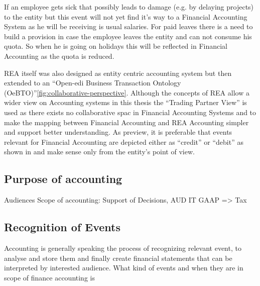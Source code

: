 If an employee gets sick that possibly leads to damage (e.g. by delaying projects) to the entity but this event will not yet find it's way to a Financial Accounting System as he will be receiving is usual salaries.
For paid leaves there is a need to build a provision in case the employee leaves the entity and can not consume his quota.
So when he is going on holidays this will be reflected in Financial Accounting as the quota is reduced.

REA itself was also designed as entity centric accounting system but then extended to an \enquote{Open-edi Business Transaction Ontology (OeBTO)}\cite[Figure 2]{ISOIEC1594442015}\ref{fig:collaborative-perspective}.
Although the concepts of REA allow a wider view on Accounting systems in this thesis the \enquote{Trading Partner View} is used as there exists no collaborative spac in Financial Accounting Systems and to make the mapping between Financial Accounting and REA Accounting simpler and support better understanding.
As preview, it is preferable that events relevant for Financial Accounting are depicted either as \enquote{credit} or \enquote{debit} as shown in \cite{schwaiger2015aleandrea} and make sense only from the entity's point of view.


\subsection{Purpose of accounting}
Audiences
Scope of accounting: Support of Decisions, AUD IT GAAP => Tax
\subsection{Recognition of Events}

Accounting is generally speaking the process of recognizing relevant event, to analyse and store them and finally create financial statements that can be interpreted by interested audience.
What kind of events and when they are in scope of finance accounting is

